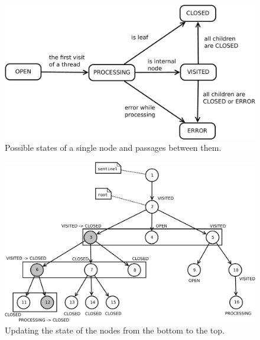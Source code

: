 \documentclass[12pt]{article}
\begin{document}
\begin{figure}[!ht]
	\centering
		\includegraphics[scale=0.35]{pics/states.pdf}
	\caption{Possible states of a single node and passages between them.}
	\label{fig:states}
\end{figure}

\begin{figure}[!ht]
	\centering
		\includegraphics[scale=0.35]{pics/tree-update_upward.pdf}
	\caption{Updating the state of the nodes from the bottom to the top.}
	\label{fig:tree-update_upward}
\end{figure}
\end{document}
